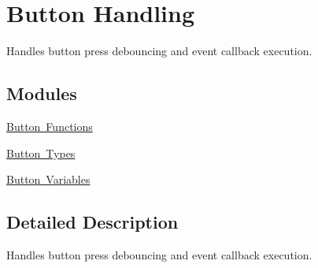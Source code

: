 \hypertarget{group___s_d___button}{}\section{Button Handling}
\label{group___s_d___button}


Handles button press debouncing and event callback execution.  


\subsection*{Modules}
\begin{DoxyCompactItemize}
\item 
\mbox{\hyperlink{group___s_d___button___functions}{Button Functions}}
\item 
\mbox{\hyperlink{group___s_d___button___types}{Button Types}}
\item 
\mbox{\hyperlink{group___s_d___button___variables}{Button Variables}}
\end{DoxyCompactItemize}


\subsection{Detailed Description}
Handles button press debouncing and event callback execution. 

